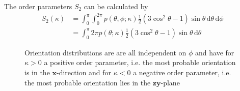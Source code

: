 The order parameters $S_2$ can be calculated by
\begin{align}
S_2(\kappa) &= 
\int_0^\pi \int_0^{2\pi} 
                p(\theta,\phi;\kappa) \frac12 \left(3\cos^2\theta - 1\right) \sin \theta \, \mathrm{d}\theta\, \mathrm{d}\phi \nonumber \\
&= \int_0^\pi 2\pi
                p(\theta;\kappa) \frac12 \left(3\cos^2\theta - 1\right) \sin \theta \, \mathrm{d}\theta
\end{align}
\begin{figure}[htb]
\hfill
{}
\caption{Orientation distributions are are all independent on $\phi$ and have for $\kappa>0$ a positive order parameter, i.e. the most probable orientation is in the $\mathbf{x}$-direction and for $\kappa<0$ a negative order parameter, i.e. the most probable orientation lies in the $\mathbf{zy}$-plane}
\label{fig:pOnsager3D}
\end{figure}
